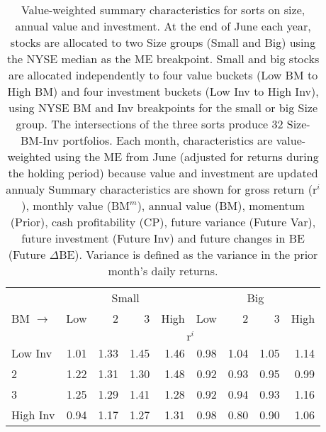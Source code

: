 
\begin{table}[!ht]
\scriptsize
\centering
\caption{
\scriptsize{
Value-weighted summary characteristics for sorts on size, annual value and
investment.
At the end of June each year, stocks are allocated to two Size groups
(Small and Big) using the NYSE median as the ME breakpoint.
Small and big stocks are allocated independently to four value buckets (Low
BM to High BM) and four investment buckets
(Low Inv to High Inv), using NYSE BM and Inv breakpoints for
the small or big Size group.
The intersections of the three sorts produce 32 Size-BM-Inv
portfolios.
Each month, characteristics are value-weighted using the ME from June
(adjusted for returns during the holding period) because value and investment
are updated annualy
Summary characteristics are shown for
gross return ($\text{r}^i$),
monthly value ($\text{BM}^m$),
annual value (BM),
momentum (Prior),
cash profitability (CP),
future variance (Future Var),
future investment (Future Inv) and
future changes in BE (Future $\Delta$BE).
Variance is defined as the variance in the prior month's daily returns.
}
}
\begin{tabular}{lrrrrrrrr}
  \toprule
     & \multicolumn{4}{c}{Small} & \multicolumn{4}{c}{Big}  \\
     \cmidrule(r){2-5} \cmidrule(r){6-9}
    BM $\rightarrow$ & Low & 2 & 3 & High & Low & 2 & 3 & High  \\ 
  \midrule
  
  
    & \multicolumn{8}{c}{$\text{r}^i$}  \\
     \cmidrule(r){2-5} \cmidrule(r){6-9}
    Low Inv  & 1.01  & 1.33  & 1.45  & 1.46  & 0.98  & 1.04  & 1.05  & 1.14   \\
    2  & 1.22  & 1.31  & 1.30  & 1.48  & 0.92  & 0.93  & 0.95  & 0.99   \\
    3  & 1.25  & 1.29  & 1.41  & 1.28  & 0.92  & 0.94  & 0.93  & 1.16   \\
    High Inv  & 0.94  & 1.17  & 1.27  & 1.31  & 0.98  & 0.80  & 0.90  & 1.06   \\
    
  
    

\end{tabular}
\end{table}
